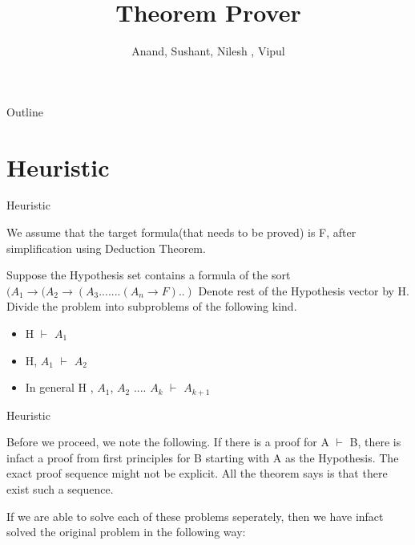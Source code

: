 \documentclass{beamer}
\title[Theorem Prover]{Theorem Prover}
\author{Anand, Sushant, Nilesh , Vipul}
\institute{INDIA}
\begin{document}
\begin{frame}
  \titlepage
\end{frame}

\begin{frame}{Outline}
  \tableofcontents
\end{frame}

\section{Heuristic}

\begin{frame}{Heuristic}

We assume that the target formula(that needs to be proved) is F, after simplification using Deduction Theorem.

Suppose the Hypothesis set contains a formula of the sort $(A_{1}\rightarrow(A_{2}\rightarrow(A_{3}.......(A_{n}\rightarrow F)..)$ 
\newline
Denote rest of the Hypothesis vector by H.
Divide the problem into subproblems of the following kind.
\begin{itemize}
  \item H $\vdash$ $A_{1}$
  \item H, $A_{1}$ $\vdash$ $A_{2}$
  \item In general H , $A_{1}$, $A_{2}$ .... $A_{k}$ $\vdash$ $A_{k+1}$
\end{itemize} 

\end{frame}


\begin{frame}{Heuristic}


Before we proceed, we note the following. If there is a proof for \newline A $\vdash$ B, there is infact a proof from first principles for B starting with A as the Hypothesis. The exact proof sequence might not be explicit. All the theorem says is that there exist such a sequence.
\newline

If we are able to solve each of these problems seperately, then we have infact solved the original problem in the following way:


\end{frame}
\end{document}
